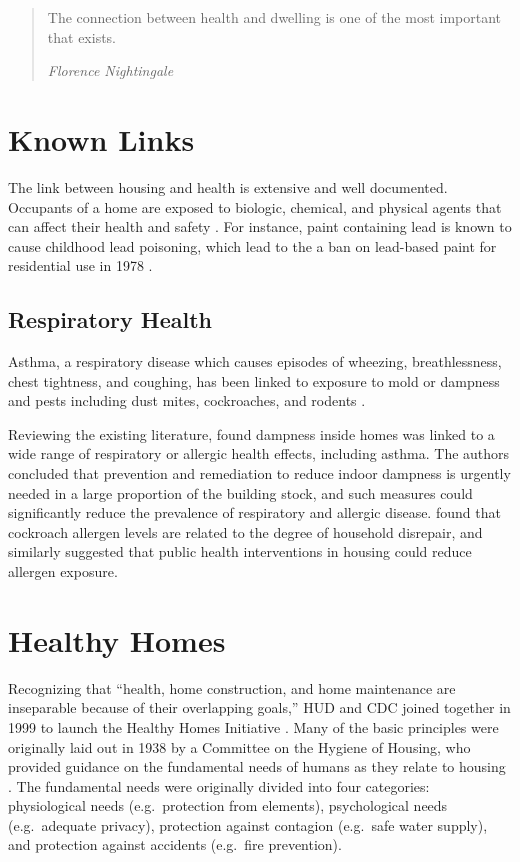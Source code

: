 \documentclass[
]{book}
\begin{document}
\begin{quote}
The connection between health and dwelling is one of the most important that exists.

\emph{Florence Nightingale}
\end{quote}

\hypertarget{known-links}{%
\section{Known Links}\label{known-links}}

The link between housing and health is extensive and well documented. Occupants of a home are exposed to biologic, chemical, and physical agents that can affect their health and safety \citep[ 63]{cdc2006}. For instance, paint containing lead is known to cause childhood lead poisoning, which lead to the a ban on lead-based paint for residential use in 1978 \citep{cdc2020}.

\hypertarget{respiratory-health}{%
\subsection{Respiratory Health}\label{respiratory-health}}

Asthma, a respiratory disease which causes episodes of wheezing, breathlessness, chest tightness, and coughing, has been linked to exposure to mold or dampness and pests including dust mites, cockroaches, and rodents \citep[ 63]{cdc2006}.

Reviewing the existing literature, \citet{mendell2011} found dampness inside homes was linked to a wide range of respiratory or allergic health effects, including asthma. The authors concluded that prevention and remediation to reduce indoor dampness is urgently needed in a large proportion of the building stock, and such measures could significantly reduce the prevalence of respiratory and allergic disease. \citet{rauh2002} found that cockroach allergen levels are related to the degree of household disrepair, and similarly suggested that public health interventions in housing could reduce allergen exposure.

\hypertarget{healthy-homes}{%
\section{Healthy Homes}\label{healthy-homes}}

Recognizing that ``health, home construction, and home maintenance are inseparable because of their overlapping goals,'' HUD and CDC joined together in 1999 to launch the Healthy Homes Initiative \citep[ 31, 34]{cdc2006}. Many of the basic principles were originally laid out in 1938 by a Committee on the Hygiene of Housing, who provided guidance on the fundamental needs of humans as they relate to housing \citetext{\citealp[ 39]{cdc2006}; \citealp{apha1938}}. The fundamental needs were originally divided into four categories: physiological needs (e.g.~protection from elements), psychological needs (e.g.~adequate privacy), protection against contagion (e.g.~safe water supply), and protection against accidents (e.g.~fire prevention).
\end{document}
